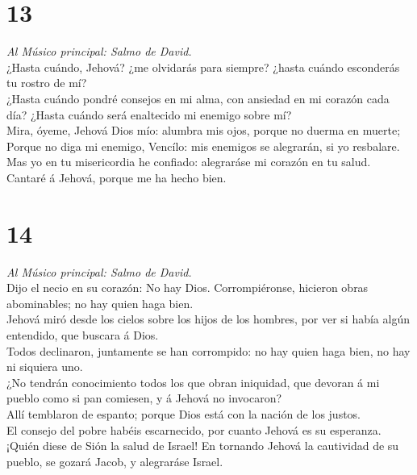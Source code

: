 \hypertarget{section-12}{%
\section{13}\label{section-12}}

 \emph{Al Músico principal: Salmo de David.}\\
¿Hasta cuándo, Jehová? ¿me olvidarás para siempre? ¿hasta cuándo
esconderás tu rostro de mí?\\
 ¿Hasta cuándo pondré consejos en mi alma, con ansiedad en
mi corazón cada día? ¿Hasta cuándo será enaltecido mi enemigo sobre
mí?\\
 Mira, óyeme, Jehová Dios mío: alumbra mis ojos, porque no
duerma en muerte;\\
 Porque no diga mi enemigo, Vencílo: mis enemigos se
alegrarán, si yo resbalare.\\
 Mas yo en tu misericordia he confiado: alegraráse mi
corazón en tu salud.\\
 Cantaré á Jehová, porque me ha hecho bien.

\hypertarget{section-13}{%
\section{14}\label{section-13}}

 \emph{Al Músico principal: Salmo de David.}\\
Dijo el necio en su corazón: No hay Dios. Corrompiéronse, hicieron obras
abominables; no hay quien haga bien.\\
 Jehová miró desde los cielos sobre los hijos de los
hombres, por ver si había algún entendido, que buscara á Dios.\\
 Todos declinaron, juntamente se han corrompido: no hay
quien haga bien, no hay ni siquiera uno.\\
 ¿No tendrán conocimiento todos los que obran iniquidad, que
devoran á mi pueblo como si pan comiesen, y á Jehová no invocaron?\\
 Allí temblaron de espanto; porque Dios está con la nación
de los justos.\\
 El consejo del pobre habéis escarnecido, por cuanto Jehová
es su esperanza.\\
 ¡Quién diese de Sión la salud de Israel! En tornando Jehová
la cautividad de su pueblo, se gozará Jacob, y alegraráse Israel.

